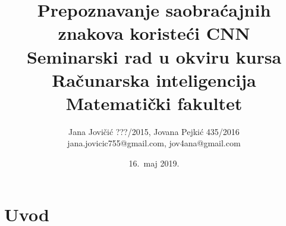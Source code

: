 \documentclass[a4paper]{article}
\begin{document}
\title{Prepoznavanje saobraćajnih znakova koristeći CNN\\ \small{Seminarski rad u okviru kursa\\Računarska inteligencija\\ Matematički fakultet}}

\author{Jana Jovičić ???/2015, Jovana Pejkić 435/2016 \\ jana.jovicic755@gmail.com, jov4ana@gmail.com}

\date{16.~maj 2019.}

\maketitle

\abstract{

}

\newpage

\tableofcontents

\newpage

\section{Uvod}
\label{sec:uvod}
\end{document}
